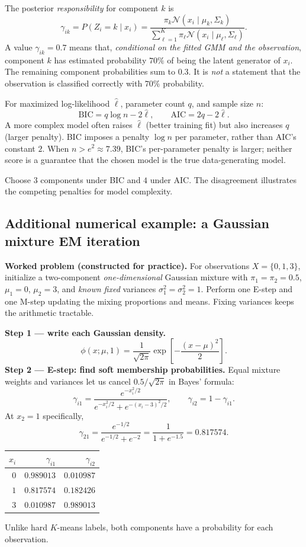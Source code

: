 The posterior \emph{responsibility} for component $k$ is
\[
\gamma_{ik}=P(Z_i=k\mid x_i)
=\frac{\pi_k\mathcal N(x_i\mid\mu_k,\Sigma_k)}{\sum_{\ell=1}^{K}\pi_\ell\mathcal N(x_i\mid\mu_\ell,\Sigma_\ell)}.
\]
A value $\gamma_{ik}=0.7$ means that, \emph{conditional on the fitted GMM and the observation}, component $k$ has estimated probability $70\%$ of being the latent generator of $x_i$. The remaining component probabilities sum to $0.3$. It is \emph{not} a statement that the observation is classified correctly with $70\%$ probability.

For maximized log-likelihood $\hat\ell$, parameter count $q$, and sample size $n$:
\[
\mathrm{BIC}=q\log n-2\hat\ell,\qquad
\mathrm{AIC}=2q-2\hat\ell.
\]
A more complex model often raises $\hat\ell$ (better training fit) but also increases $q$ (larger penalty). BIC imposes a penalty $\log n$ per parameter, rather than AIC's constant $2$. When $n>e^2\approx7.39$, BIC's per-parameter penalty is larger; neither score is a guarantee that the chosen model is the true data-generating model.
\begin{answer}
Choose $\boxed{3}$ components under BIC and $\boxed{4}$ under AIC. The disagreement illustrates the competing penalties for model complexity.
\end{answer}

\subsection*{Additional numerical example: a Gaussian mixture EM iteration}
\textbf{Worked problem (constructed for practice).} For observations $X=\{0,1,3\}$, initialize a two-component \emph{one-dimensional} Gaussian mixture with $\pi_1=\pi_2=0.5$, $\mu_1=0$, $\mu_2=3$, and \emph{known fixed} variances $\sigma_1^2=\sigma_2^2=1$. Perform one E-step and one M-step updating the mixing proportions and means. Fixing variances keeps the arithmetic tractable.

\textbf{Step 1 --- write each Gaussian density.}
\[
\phi(x;\mu,1)=\frac{1}{\sqrt{2\pi}}\exp\!\left[-\frac{(x-\mu)^2}{2}\right].
\]
\textbf{Step 2 --- E-step: find soft membership probabilities.} Equal mixture weights and variances let us cancel $0.5/\sqrt{2\pi}$ in Bayes' formula:
\[
\gamma_{i1}=\frac{e^{-x_i^2/2}}{e^{-x_i^2/2}+e^{-(x_i-3)^2/2}},\qquad
\gamma_{i2}=1-\gamma_{i1}.
\]
At $x_2=1$ specifically,
\[
\gamma_{21}=\frac{e^{-1/2}}{e^{-1/2}+e^{-2}}
=\frac{1}{1+e^{-1.5}}=\boxed{0.817574}.
\]
\begin{center}\begin{tabular}{@{}rrr@{}}\toprule $x_i$ & $\gamma_{i1}$ & $\gamma_{i2}$\\\midrule
$0$ & $0.989013$ & $0.010987$\\
$1$ & $0.817574$ & $0.182426$\\
$3$ & $0.010987$ & $0.989013$\\\bottomrule
\end{tabular}\end{center}
Unlike hard $K$-means labels, both components have a probability for each observation.

